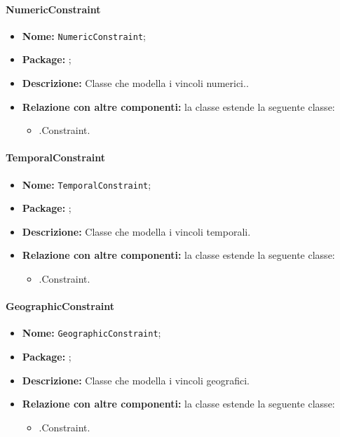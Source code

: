 \paragraph{NumericConstraint}
\begin{itemize}
\item \textbf{Nome:} \texttt{NumericConstraint};
\item \textbf{Package:} \texttt{\smodel{}};
\item \textbf{Descrizione:} Classe che modella i vincoli numerici..
\item \textbf{Relazione con altre componenti:} la classe estende la seguente classe:
		\begin{itemize}
			\item \smodel{}.Constraint.
		\end{itemize}
\end{itemize}

\paragraph{TemporalConstraint}
\begin{itemize}
\item \textbf{Nome:} \texttt{TemporalConstraint};
\item \textbf{Package:} \texttt{\smodel{}};
\item \textbf{Descrizione:} Classe che modella i vincoli temporali.
\item \textbf{Relazione con altre componenti:} la classe estende la seguente classe:
		\begin{itemize}
			\item \smodel{}.Constraint.
		\end{itemize}
\end{itemize}

\paragraph{GeographicConstraint}
\begin{itemize}
\item \textbf{Nome:} \texttt{GeographicConstraint};
\item \textbf{Package:} \texttt{\smodel{}};
\item \textbf{Descrizione:} Classe che modella i vincoli geografici.
\item \textbf{Relazione con altre componenti:} la classe estende la seguente classe:
		\begin{itemize}
			\item \smodel{}.Constraint.
		\end{itemize}
\end{itemize}

